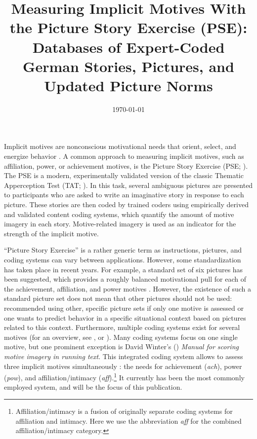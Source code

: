 \documentclass[man,a4paper,mask]{apa6}
\title{Measuring Implicit Motives With the Picture Story Exercise (PSE): Databases of Expert-Coded German Stories, Pictures, and Updated Picture Norms}
\date{\today}
\begin{document}
\maketitle	%
Implicit motives are nonconscious motivational needs that orient, select, and energize behavior \parencite{mcclelland_human_1987}. A common approach to measuring implicit motives, such as affiliation, power, or achievement motives, is the Picture Story Exercise (PSE; ). The PSE is a modern, experimentally validated version of the classic Thematic Apperception Test (TAT; ). In this task, several ambiguous pictures are presented to participants who are asked to write an imaginative story in response to each picture. These stories are then coded by trained coders using empirically derived and validated content coding systems, which quantify the amount of motive imagery in each story. Motive-related imagery is used as an indicator for the strength of the implicit motive.

``Picture Story Exercise'' is a rather generic term as instructions, pictures, and coding systems can vary between applications. However, some standardization has taken place in recent years. For example, a standard set of six pictures has been suggested, which provides a roughly balanced motivational pull for each of the achievement, affiliation, and power motives \parencite{schultheiss_MeasuringImplicitMotives_2007}. However, the existence of such a standard picture set does not mean that other pictures should not be used: \textcite{schultheiss_MeasuringImplicitMotives_2007} recommended using other, specific picture sets if only one motive is assessed or one wants to predict behavior in a specific situational context based on pictures related to this context. Furthermore, multiple coding systems exist for several motives (for an overview, see , or ). Many coding systems focus on one single motive, but one prominent exception is David Winter's (\citeyear{winter_ManualScoringMotive_1994}) \emph{Manual for scoring motive imagery in running text}. This integrated coding system allows to assess three implicit motives simultaneously \parencite{winter_MeasuringPersonalityDistance_1991}: the needs for achievement (\emph{ach}), power (\emph{pow}), and affiliation/intimacy (\emph{aff}).\footnote{Affiliation/intimacy is a fusion of originally separate coding systems for affiliation and intimacy. Here we use the abbreviation \emph{aff} for the combined affiliation/intimacy category.} It currently has been the most commonly employed system, and will be the focus of this publication.
\end{document}
